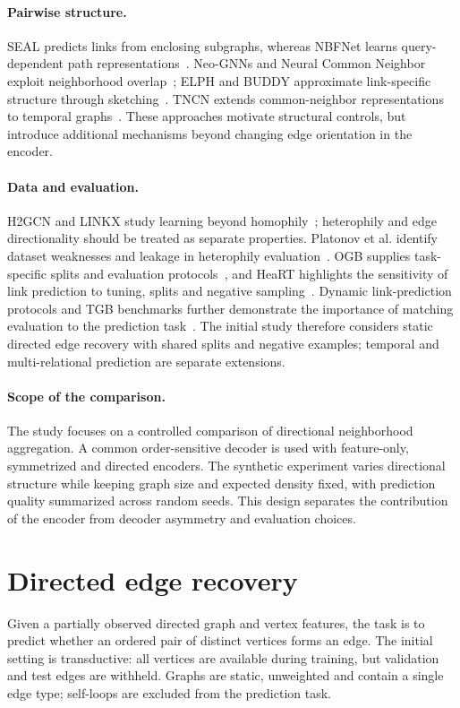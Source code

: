 \documentclass{article}
\begin{document}
\paragraph{Pairwise structure.}
SEAL predicts links from enclosing subgraphs, whereas NBFNet learns query-dependent path representations~\cite{seal,nbfnet}.
Neo-GNNs and Neural Common Neighbor exploit neighborhood overlap~\cite{neognn,ncn}; ELPH and BUDDY approximate link-specific structure through sketching~\cite{buddy}.
TNCN extends common-neighbor representations to temporal graphs~\cite{tncn}.
These approaches motivate structural controls, but introduce additional mechanisms beyond changing edge orientation in the encoder.

\paragraph{Data and evaluation.}
H2GCN and LINKX study learning beyond homophily~\cite{h2gcn,linkx}; heterophily and edge directionality should be treated as separate properties.
Platonov et al. identify dataset weaknesses and leakage in heterophily evaluation~\cite{critical}.
OGB supplies task-specific splits and evaluation protocols~\cite{ogb}, and HeaRT highlights the sensitivity of link prediction to tuning, splits and negative sampling~\cite{heart}.
Dynamic link-prediction protocols and TGB benchmarks further demonstrate the importance of matching evaluation to the prediction task~\cite{dynamic_eval,tgb,tgb2}.
The initial study therefore considers static directed edge recovery with shared splits and negative examples; temporal and multi-relational prediction are separate extensions.

\paragraph{Scope of the comparison.}
The study focuses on a controlled comparison of directional neighborhood aggregation.
A common order-sensitive decoder is used with feature-only, symmetrized and directed encoders.
The synthetic experiment varies directional structure while keeping graph size and expected density fixed, with prediction quality summarized across random seeds.
This design separates the contribution of the encoder from decoder asymmetry and evaluation choices.

\section{Directed edge recovery}
\label{sec:problem}
Given a partially observed directed graph and vertex features, the task is to predict whether an ordered pair of distinct vertices forms an edge.
The initial setting is transductive: all vertices are available during training, but validation and test edges are withheld.
Graphs are static, unweighted and contain a single edge type; self-loops are excluded from the prediction task.
\end{document}
